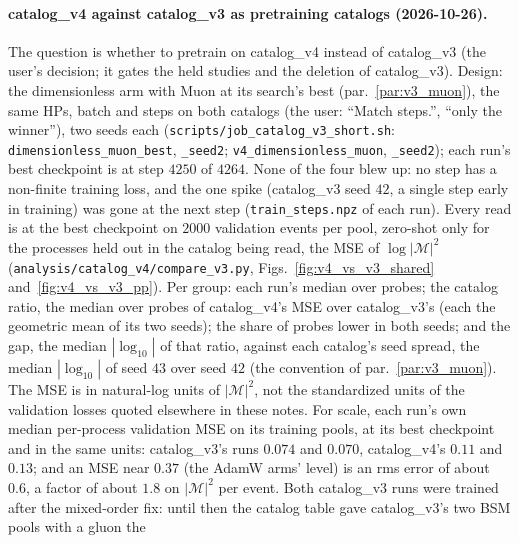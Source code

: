 \documentclass[11pt]{article}
\newcommand{\code}[1]{\texttt{#1}}
\begin{document}
\paragraph{catalog\_v4 against catalog\_v3 as pretraining catalogs (2026-10-26).}\label{par:v4_vs_v3} The question
is whether to pretrain on catalog\_v4 instead of catalog\_v3 (the user's decision; it gates the held studies and the
deletion of catalog\_v3). Design: the dimensionless arm with Muon at its search's best (par.~\ref{par:v3_muon}), the
same HPs, batch and steps on both catalogs (the user: ``Match steps.'', ``only the winner''), two seeds each
(\code{scripts/job\_catalog\_v3\_short.sh}: \code{dimensionless\_muon\_best}, \code{\_seed2};
\code{v4\_dimensionless\_muon}, \code{\_seed2}); each run's best checkpoint is at step $4250$ of $4264$. None of the four blew up: no step has a non-finite training
loss, and the one spike (catalog\_v3 seed $42$, a single step early in training) was gone at the next step
(\code{train\_steps.npz} of each run). Every read is at the best checkpoint on $2000$ validation events per pool,
zero-shot only for the processes held out in the catalog being read, the MSE of
$\log|\mathcal M|^2$ (\code{analysis/catalog\_v4/compare\_v3.py}, Figs.~\ref{fig:v4_vs_v3_shared}
and~\ref{fig:v4_vs_v3_pp}). Per group: each run's median over probes; the catalog ratio, the median over probes of
catalog\_v4's MSE over catalog\_v3's (each the geometric mean of its two seeds); the share of probes lower in both
seeds; and the gap, the median $|\log_{10}|$ of that ratio, against each catalog's seed spread, the median
$|\log_{10}|$ of seed $43$ over seed $42$ (the convention of par.~\ref{par:v3_muon}).
The MSE is in natural-log units of $|\mathcal M|^2$, not the standardized units of the validation losses quoted
elsewhere in these notes. For scale, each run's own median per-process validation MSE on its training pools, at its
best checkpoint and in the same units: catalog\_v3's runs $0.074$ and $0.070$, catalog\_v4's $0.11$ and $0.13$; and an
MSE near $0.37$ (the AdamW arms' level) is an rms error of about $0.6$, a factor of about $1.8$ on $|\mathcal M|^2$ per event. Both catalog\_v3 runs were
trained after the mixed-order fix: until then the catalog table gave catalog\_v3's two BSM pools with a gluon the
\end{document}
